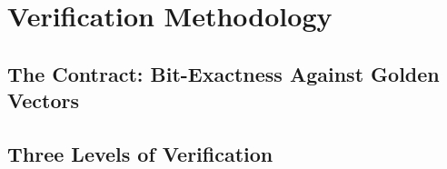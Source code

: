 %
%
\chapter{Verification Methodology}
\label{chap:verification}

\section{The Contract: Bit-Exactness Against Golden Vectors}
\label{sec:bit-exact-contract}

\section{Three Levels of Verification}
\label{sec:three-levels}

